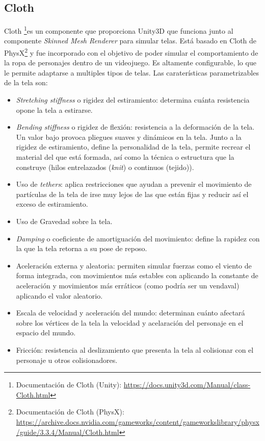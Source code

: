 \subsection{Cloth}
\label{subsec:cloth}
Cloth \footnote{Documentación de Cloth (Unity): \url{https://docs.unity3d.com/Manual/class-Cloth.html}}es un componente que proporciona Unity3D que funciona junto al componente \textit{Skinned Mesh Renderer} para simular telas. Está basado en Cloth de PhysX\footnote{Documentación de Cloth (PhysX): \url{https://archive.docs.nvidia.com/gameworks/content/gameworkslibrary/physx/guide/3.3.4/Manual/Cloth.html}} y fue incorporado con el objetivo de poder simular el comportamiento de la ropa de personajes dentro de un videojuego. Es altamente configurable, lo que le permite adaptarse a multiples tipos de telas. Las caraterísticas parametrizables de la tela son: 
\begin{itemize}
  \item \textit{Stretching stiffness} o rigidez del estiramiento: determina cuánta resistencia opone la tela a estirarse.
  \item \textit{Bending stiffness} o rigidez de flexión: resistencia a la deformación de la tela. Un valor bajo provoca pliegues suaves y dinámicos en la tela. Junto a la rigidez de estiramiento, define la personalidad de la tela, permite recrear el material del que está formada, así como la técnica o estructura que la construye (hilos entrelazados (\textit{knit}) o continuos (tejido)).
  \item Uso de \textit{tethers}: aplica restricciones que ayudan a prevenir el movimiento de partículas de la tela de irse muy lejos de las que están fijas y reducir así el exceso de estiramiento.
  \item Uso de Gravedad sobre la tela.
  \item \textit{Damping} o coeficiente de amortiguación del movimiento: define la rapidez con la que la tela retorna a su pose de reposo.
  \item Aceleración externa y aleatoria: permiten simular fuerzas como el viento de forma integrada, con movimientos más estables con aplicando la constante de aceleración y movimientos más erráticos (como podría ser un vendaval) aplicando el valor aleatorio. 
  \item Escala de velocidad y aceleración del mundo: determinan cuánto afectará sobre los vértices de la tela la velocidad y acelaración del personaje en el espacio del mundo.
  \item Fricción: resistencia al deslizamiento que presenta la tela al colisionar con el personaje u otros colisionadores.

\end{itemize}
